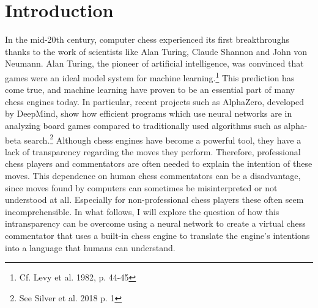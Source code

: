 \section{Introduction}

In the mid-20th century, computer chess experienced its first breakthroughs thanks to the work of scientists like Alan Turing, Claude Shannon and John von Neumann. Alan Turing, the pioneer of artificial intelligence, was convinced that games were an ideal model system for machine learning.\footnote{Cf. Levy et al. 1982, p. 44-45} This prediction has come true, and machine learning have proven to be an essential part of many chess engines today. In particular, recent projects such as AlphaZero, developed by DeepMind, show how efficient programs which use neural networks are in analyzing board games compared to traditionally used algorithms such as alpha-beta search.\footnote{See Silver et al. 2018 p. 1} Although chess engines have become a powerful tool, they have a lack of transparency regarding the moves they perform. Therefore, professional chess players and commentators are often needed to explain the intention of these moves. This dependence on human chess commentators can be a disadvantage, since moves found by computers can sometimes be misinterpreted or not understood at all. Especially for non-professional chess players these often seem incomprehensible. In what follows, I will explore the question of how this intransparency can be overcome using a neural network to create a virtual chess commentator that uses a built-in chess engine to translate the engine's intentions into a language that humans can understand.